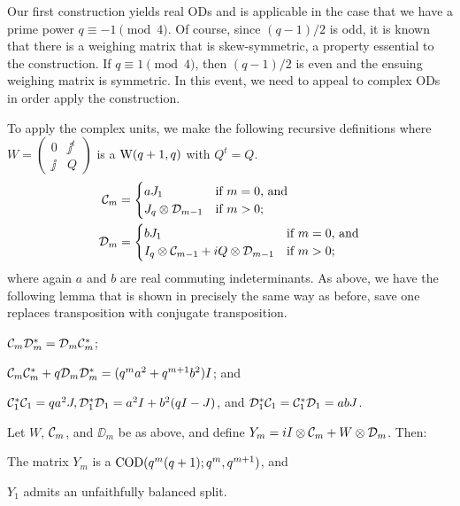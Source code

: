\documentclass[../../../main]{subfiles}
\begin{document}
Our first construction yields real ODs and is applicable in the case that we
have a prime power $q \equiv -1 \pmod{4}$. Of course, since $(q-1)/2$ is odd, it
is known \cite[see][]{combinatorics-of-symmetric-designs} that there is a weighing matrix that is skew-symmetric, a property essential to the construction. If $q \equiv 1 \pmod{4}$, then $(q-1)/2$ is even and the ensuing weighing matrix is symmetric. In this event, we need to appeal to complex ODs in order apply the construction.

To apply the complex units, we make the following recursive definitions where $W=\left(\begin{smallmatrix} 0 & \jj^t \\ \jj & Q \end{smallmatrix}\right)$ is a $\text{W}(q+1,q)$ with $Q^t=Q$.
\begin{align*}
 \mathcal{C}_m&=\begin{cases}
        aJ_1 & \text{if $m=0$, and} \\
        J_q \otimes \mathcal{D}_{m-1} & \text{if $m>0$;}
       \end{cases}\\
 \mathcal{D}_m&=\begin{cases}
        bJ_1 & \text{if $m=0$, and} \\
        I_q \otimes \mathcal{C}_{m-1} + iQ \otimes \mathcal{D}_{m-1} & \text{if $m>0$;}
       \end{cases}
\end{align*}
where again $a$ and $b$ are real commuting indeterminants. As above, we have the following lemma that is shown in precisely the same way as before, save one replaces transposition with conjugate transposition.

\begin{lem}
  \begin{defenum}
  \item[]
  \item $\mathcal{C}_m\mathcal{D}_m^* = \mathcal{D}_m\mathcal{C}_m^*$;
  \item $\mathcal{C}_m\mathcal{C}_m^* + q\mathcal{D}_m\mathcal{D}_m^* = (q^ma^2+q^{m+1}b^2)I$; and
  \item $\mathcal{C}_1^*\mathcal{C}_1 = qa^2J, \mathcal{D}_1^*\mathcal{D}_1=a^2I+b^2(qI-J)$, and $\mathcal{D}_1^*\mathcal{C}_1=\mathcal{C}_1^*\mathcal{D}_1=abJ$.
 \end{defenum}
\end{lem}

\begin{thm}
 Let $W$, $\mathcal{C}_m$, and $\DD_m$ be as above, and define $Y_m=iI \otimes \mathcal{C}_m + W \otimes \mathcal{D}_m$. Then:
 \begin{defenum}
  \item The matrix $Y_m$ is a $\text{COD}(q^m(q+1); q^m, q^{m+1})$, and
  \item $Y_1$ admits an unfaithfully balanced split.
 \end{defenum}
\end{thm}
\end{document}
